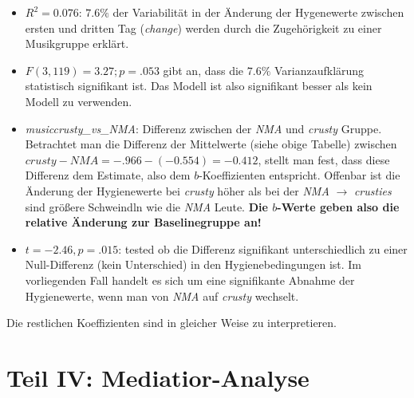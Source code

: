\documentclass[]{article}
\providecommand{\tightlist}{%
  \setlength{\itemsep}{0pt}\setlength{\parskip}{0pt}}
\begin{document}
\begin{itemize}
\tightlist
\item
  \(R^2 = 0.076\): \(7.6\%\) der Variabilität in der Änderung der Hygenewerte zwischen ersten und dritten Tag (\emph{change}) werden durch die Zugehörigkeit zu einer Musikgruppe erklärt.
\item
  \(F(3, 119) = 3.27; p = .053\) gibt an, dass die \(7.6\%\) Varianzaufklärung statistisch signifikant ist. Das Modell ist also signifikant besser als kein Modell zu verwenden.
\item
  \emph{musiccrusty\_vs\_NMA}: Differenz zwischen der \emph{NMA} und \emph{crusty} Gruppe. Betrachtet man die Differenz der Mittelwerte (siehe obige Tabelle) zwischen \(crusty - NMA = -.966 - (-0.554) = -0.412\), stellt man fest, dass diese Differenz dem Estimate, also dem \(b\)-Koeffizienten entspricht. Offenbar ist die Änderung der Hygienewerte bei \emph{crusty} höher als bei der \emph{NMA} \(\rightarrow\) \emph{crusties} sind größere Schweindln wie die \emph{NMA} Leute. \textbf{Die \(b\)-Werte geben also die relative Änderung zur Baselinegruppe an!}
\item
  \(t = -2.46, p = .015\): tested ob die Differenz signifikant unterschiedlich zu einer Null-Differenz (kein Unterschied) in den Hygienebedingungen ist. Im vorliegenden Fall handelt es sich um eine signifikante Abnahme der Hygienewerte, wenn man von \emph{NMA} auf \emph{crusty} wechselt.
\end{itemize}

Die restlichen Koeffizienten sind in gleicher Weise zu interpretieren.

\hypertarget{part-teil-iv-mediatior-analyse}{%
\part*{Teil IV: Mediatior-Analyse}\label{part-teil-iv-mediatior-analyse}}
\end{document}
